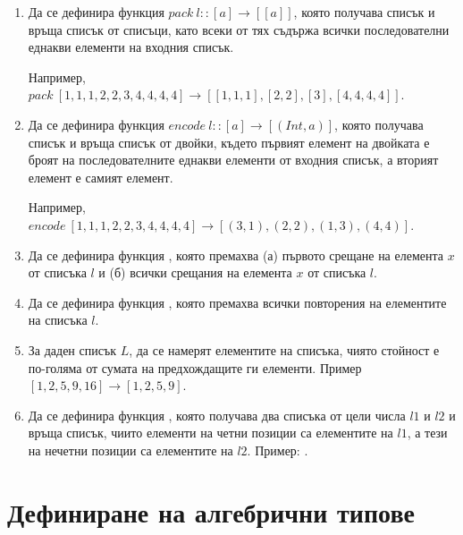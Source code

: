 \begin{enumerate}[]
	\item Да се дефинира функция $pack \: l :: [a] \rightarrow [[a]]$, която получава списък и връща списък от списъци, като всеки от тях съдържа всички последователни еднакви елементи на входния списък.
	
	Например, $pack \: [1,1,1,2,2,3,4,4,4,4] \rightarrow [[1,1,1],[2,2],[3],[4,4,4,4]]$.

	\item Да се дефинира функция $encode \: l :: [a] \rightarrow [(Int,a)]$, която получава списък и връща списък от двойки, където първият елемент на двойката е броят на последователните еднакви елементи от входния списък, а вторият елемент е самият елемент.
	
	Например, $encode \: [1,1,1,2,2,3,4,4,4,4] \rightarrow [(3,1),(2,2),(1,3),(4,4)]$.

	\item Да се дефинира функция , която премахва (а) първото срещане на елемента $x$ от списъка $l$ и (б) всички срещания на елемента $x$ от списъка $l$.
		
	\item Да се дефинира функция , която премахва всички повторения на елементите на списъка $l$.
	
	\item За даден списък $L$, да се намерят елементите на списъка, чиято стойност е по-голяма от сумата на предхождащите ги елементи. Пример $[1,2,5,9,16] \rightarrow [1,2,5,9]$.
	
	\item Да се дефинира функция , която получава два списъка от цели числа $l1$ и $l2$ и връща списък, чиито елементи на четни позиции са елементите на $l1$, а тези на нечетни позиции са елементите на $l2$. Пример: .


\end{enumerate}

\section {Дефиниране на алгебрични типове}

